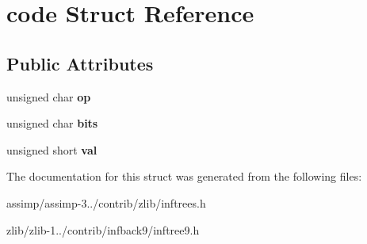 \hypertarget{structcode}{\section{code Struct Reference}
\label{structcode}
}
\subsection*{Public Attributes}
\begin{DoxyCompactItemize}
\item 
\hypertarget{structcode_a4f075d73a9177d05cc7d332105295b83}{unsigned char {\bfseries op}}\label{structcode_a4f075d73a9177d05cc7d332105295b83}

\item 
\hypertarget{structcode_a5defcebb356dca1a5a8d39995f28d66b}{unsigned char {\bfseries bits}}\label{structcode_a5defcebb356dca1a5a8d39995f28d66b}

\item 
\hypertarget{structcode_a6f9c73627997e8fc6df02e620cf9a6f5}{unsigned short {\bfseries val}}\label{structcode_a6f9c73627997e8fc6df02e620cf9a6f5}

\end{DoxyCompactItemize}


The documentation for this struct was generated from the following files\+:\begin{DoxyCompactItemize}
\item 
assimp/assimp-\/3../contrib/zlib/inftrees.\+h\item 
zlib/zlib-\/1../contrib/infback9/inftree9.\+h\end{DoxyCompactItemize}
